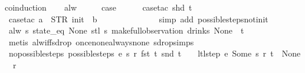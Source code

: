 \begin{isabellebody}
%
\isadelimproof
%
\endisadelimproof
%
\isatagproof
{}\isamarkupfalse%
{\isacharparenleft}coinduction{\isacharparenright}\isanewline
\ \ \isamarkupfalse%
\ alw\isanewline
\ \ \isamarkupfalse%
\ \isamarkupfalse%
\ {\isacharquery}case\isanewline
\ \ \ \ \isamarkupfalse%
\ {\isacharparenleft}case{\isacharunderscore}tac\ {\isachardoublequoteopen}shd\ t{\isachardoublequoteclose}{\isacharparenright}\isanewline
\ \ \ \ \isamarkupfalse%
\ {\isacharparenleft}case{\isacharunderscore}tac\ {\isachardoublequoteopen}a\ {\isacharequal}\ STR\ {\isacharprime}{\isacharprime}init{\isacharprime}{\isacharprime}\ {\isasymand}\ b\ {\isacharequal}\ {\isacharbrackleft}{\isacharbrackright}{\isachardoublequoteclose}{\isacharparenright}\isanewline
\ \ \ \ \ \isamarkupfalse%
\isanewline
\ \ \ \ \ \isamarkupfalse%
\ {\isacharparenleft}simp\ add{\isacharcolon}\ possible{\isacharunderscore}steps{\isacharunderscore}not{\isacharunderscore}init{\isacharparenright}\isanewline
\ \ \ \ \isamarkupfalse%
%
\endisatagproof
{\isafoldproof}%
%
\isadelimproof
\isanewline
%
\endisadelimproof
\isanewline
\isanewline
{}\isamarkupfalse%
\ {\isachardoublequoteopen}alw\ {\isacharparenleft}{\isasymlambda}s{\isachardot}\ state_eq\ None\ {\isacharparenleft}stl\ s{\isacharparenright}{\isacharparenright}\ {\isacharparenleft}make{\isacharunderscore}full{\isacharunderscore}observation\ drinks\ None\ {\isacharless}{\isachargreater}\ t{\isacharparenright}{\isachardoublequoteclose}\isanewline
%
\isadelimproof
\ \ %
\endisadelimproof
%
\isatagproof
{}\isamarkupfalse%
\ {\isacharparenleft}metis\ alw{\isacharunderscore}iff{\isacharunderscore}sdrop\ once{\isacharunderscore}none{\isacharunderscore}always{\isacharunderscore}none\ sdrop{\isacharunderscore}simps{\isacharparenleft}{}{\isacharparenright}{\isacharparenright}%
\endisatagproof
{\isafoldproof}%
%
\isadelimproof
\isanewline
%
\endisadelimproof
\isanewline
{}\isamarkupfalse%
\ no{\isacharunderscore}possible{\isacharunderscore}steps{\isacharcolon}\ {\isachardoublequoteopen}possible{\isacharunderscore}steps\ e\ s\ r\ {\isacharparenleft}fst\ t{\isacharparenright}\ {\isacharparenleft}snd\ t{\isacharparenright}\ {\isacharequal}\ {\isacharbraceleft}{\isacharbar}{\isacharbar}{\isacharbraceright}\ {\isasymLongrightarrow}\ ltl{\isacharunderscore}step\ e\ {\isacharparenleft}Some\ s{\isacharparenright}\ r\ t\ {\isacharequal}\ {\isacharparenleft}None{\isacharcomma}\ {\isacharbrackleft}{\isacharbrackright}{\isacharcomma}\ r{\isacharparenright}{\isachardoublequoteclose}\isanewline

\end{isabellebody}
